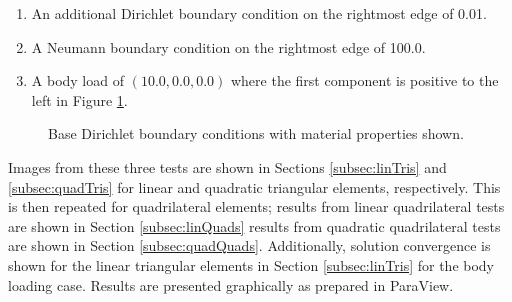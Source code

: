\documentclass[a4paper, 12pt]{article}
\begin{document}
\begin{enumerate}
  \item An additional Dirichlet boundary condition on the 
        rightmost edge of 0.01.
  \item A Neumann boundary condition on the rightmost edge
        of 100.0.
  \item A body load of $(10.0, 0.0, 0.0)$ where the first component
        is positive to the left in Figure \ref{fig:DiriBC}.
\end{enumerate}

\begin{figure}[H]
  \centering
{}
  \caption{Base Dirichlet boundary conditions with material 
            properties shown.}
  \label{fig:DiriBC}
\end{figure} 

Images from these three tests are shown in Sections \ref{subsec:linTris}
and \ref{subsec:quadTris} for linear and quadratic triangular
elements, respectively. 
This is then repeated for quadrilateral elements; 
results from linear quadrilateral tests are shown in 
Section \ref{subsec:linQuads}
results from quadratic quadrilateral tests are shown in 
Section \ref{subsec:quadQuads}.
Additionally, solution convergence 
is shown for the linear triangular elements 
in Section \ref{subsec:linTris} for the body loading case.
Results are presented graphically as prepared in ParaView.
\end{document}
